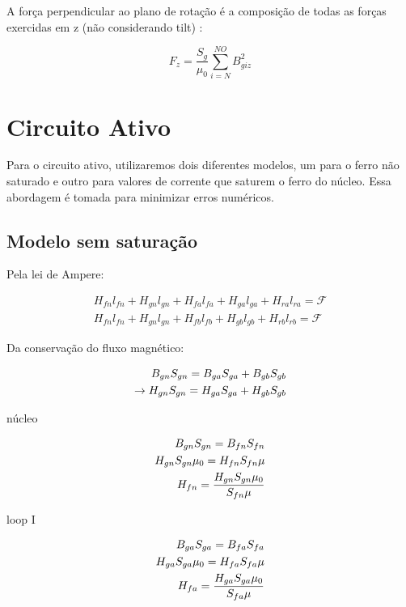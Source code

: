 A força perpendicular ao plano de rotação é a composição de todas as forças exercidas em z (não considerando tilt) :

\begin{equation}
	  		F_z = \frac{S_{g}}{\mu_0} 	\sum_{i=N}^{NO} B_{giz}^2
\end{equation}


\newpage
\section{Circuito Ativo}

Para o circuito ativo, utilizaremos dois diferentes modelos, um para o ferro não saturado e outro para valores de corrente que saturem o ferro do núcleo. Essa abordagem é tomada para minimizar erros numéricos.


\subsection{Modelo sem saturação}

Pela lei de Ampere:

\begin{align}
	H_{fn} l_{fn} + H_{gn} l_{gn} + H_{fa} l_{fa} + H_{ga} l_{ga} + H_{ra} l_{ra}= \mathcal{F} \label{eq:at:loop1} \\ 
	H_{fn} l_{fn} + H_{gn} l_{gn} + H_{fb} l_{fb} + H_{gb} l_{gb} + H_{rb} l_{rb}= \mathcal{F}  \label{eq:at:loop2}
\end{align}

Da conservação do fluxo magnético:

\begin{eqnarray}
	B_{gn} S_{gn} =  B_{ga} S_{ga} + B_{gb} S_{gb} \notag \\
	\rightarrow H_{gn} S_{gn} =  H_{ga} S_{ga} + H_{gb} S_{gb}  \label{eq:at:bgnsgn}
\end{eqnarray}

núcleo

\begin{align}
	B_{gn} S_{gn} = B_{fn} S_{fn} \notag \\
		H_{gn} S_{gn} \mu_0 = H_{fn} S_{fn} \mu \notag \\
		H_{fn} = \frac{H_{gn} S_{gn} \mu_0}{S_{fn} \mu} \label{eq:at:hfn}
\end{align}

loop I

\begin{align}
	B_{ga} S_{ga} = B_{fa} S_{fa} \notag \\
		H_{ga} S_{ga} \mu_0 = H_{fa} S_{fa} \mu \notag \\
		H_{fa} = \frac{H_{ga} S_{ga} \mu_0}{S_{fa} \mu} \label{eq:at:hfa}
\end{align}

